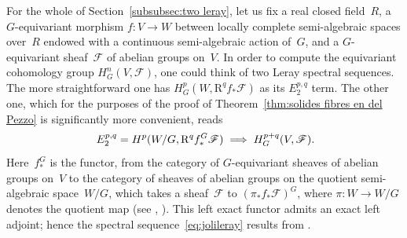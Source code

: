 \documentclass[JEP,XML,SOM,Unicode]{cedram}
\newcommand\implique{\mathchoice{\implies}{\Rightarrow}{\Rightarrow}{\Rightarrow}}
\theoremstyle{plain}
\theoremstyle{definition}
\numberwithin{equation}{section}
\newcommand{\sF}{{\mathscr F}}
\newcommand{\RR}{{\mathrm{R}}}
\begin{document}
For the whole of Section~\ref{subsubsec:two leray},
let us fix a real closed field~$R$,
a $G$\nobreakdash-equivariant morphism $f:V\to W$
between locally complete semi-algebraic spaces over~$R$ endowed with a continuous semi-algebraic action
of~$G$, and a $G$\nobreakdash-equivariant sheaf~$\sF$ of abelian groups on~$V$.
In order to compute the equivariant cohomology group $H^n_G(V,\sF)$,
one could think
of two Leray spectral sequences.
The more straightforward one has $H^p_G(W,\RR^qf_*\sF)$ as its $E_2^{p,q}$ term.
The other one, which for the purposes of the proof of
Theorem~\ref{thm:solides fibres en del Pezzo}
is significantly more convenient, reads
\begin{equation}
\label{eq:jolileray}
E_2^{p,q} = H^p(W/G,\RR^q f^G_*\sF) \implique H^{p+q}_G(V,\sF)\rlap{.}
\end{equation}
Here~$f^G_*$ is the functor, from the category of $G$\nobreakdash-equivariant sheaves of abelian
groups on~$V$ to the category of sheaves of abelian groups on the quotient semi-algebraic space~$W/G$,
which takes a sheaf~$\sF$ to $(\pi_*f_*\sF)^G$,
where $\pi:W\to W/G$ denotes the quotient map
(see \cite[Cor.\,1.6]{brumfielquotient}, \cite[Prop.\,3.5]{delfsknebuschsemialgretractions}).
This left exact functor admits an exact left adjoint;
hence the spectral sequence~\eqref{eq:jolileray} results from \cite[Prop.\,2.3.10, Th.\,5.8.3]{weibelbook}.
\end{document}
